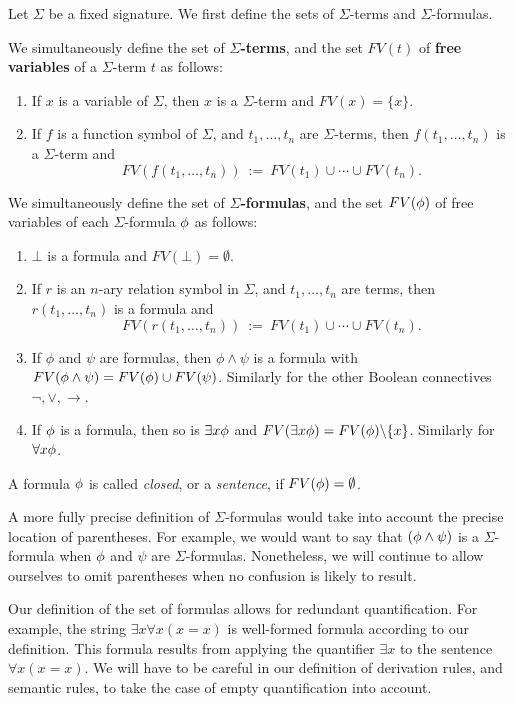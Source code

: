 Let $\Sigma$ be a fixed signature.  We first define the sets of
$\Sigma$-terms and $\Sigma$-formulas.

\begin{defn} We simultaneously define the set of
  \textbf{$\Sigma$-terms}, and the set $FV(t)$ of \textbf{free
    variables} of a $\Sigma$-term $t$ as follows:
  \begin{enumerate}
  \item If $x$ is a variable of $\Sigma$, then $x$ is a $\Sigma$-term
    and $FV(x)=\{ x\}$.
  \item If $f$ is a function symbol of $\Sigma$, and $t_1,\dots ,t_n$
    are $\Sigma$-terms, then $f(t_1,\dots ,t_n)$ is a $\Sigma$-term
    and
    $$ FV(f(t_1,\dots ,t_n)) \: := \: FV(t_1)\cup\cdots\cup FV(t_n) .$$  \end{enumerate}
\end{defn}

\begin{defn} We simultaneously define the set of
  \textbf{$\Sigma$-formulas}, and the set $FV(\phi )$ of free variables
  of each $\Sigma$-formula $\phi$ as follows:
\begin{enumerate}
\item $\bot$ is a formula and $FV(\bot )=\emptyset$.
\item If $r$ is an $n$-ary relation symbol in $\Sigma$, and
  $t_1,\dots ,t_n$ are terms, then $r(t_1,\dots ,t_n)$ is a formula
  and
  $$ FV(r(t_1,\dots ,t_n)) \: := \: FV(t_1)\cup\cdots\cup FV(t_n) .$$
\item If $\phi$ and $\psi$ are formulas, then $\phi\wedge \psi$ is a
  formula with $FV(\phi\wedge\psi )=FV(\phi )\cup FV(\psi )$.  Similarly
  for the other Boolean connectives $\neg ,\vee,\to$.
\item If $\phi$ is a formula, then so is $\exists x\phi$ and
  $FV(\exists x\phi )=FV(\phi )\backslash \{ x\}$.  Similarly for
  $\forall x\phi$.  \end{enumerate} A formula $\phi$ is called
\emph{closed}, or a \emph{sentence}, if $FV(\phi
)=\emptyset$.  \end{defn}

A more fully precise definition of $\Sigma$-formulas would take into
account the precise location of parentheses.  For example, we would
want to say that $(\phi\wedge \psi )$ is a $\Sigma$-formula when $\phi$
and $\psi$ are $\Sigma$-formulas.  Nonetheless, we will continue to
allow ourselves to omit parentheses when no confusion is likely to
result.

\begin{note} Our definition of the set of formulas allows for
  redundant quantification.  For example, the string
  $\exists x\forall x(x=x)$ is well-formed formula according to our
  definition.  This formula results from applying the quantifier
  $\exists x$ to the sentence $\forall x(x=x)$.  We will have to be
  careful in our definition of derivation rules, and semantic rules,
  to take the case of empty quantification into account.
\end{note}

